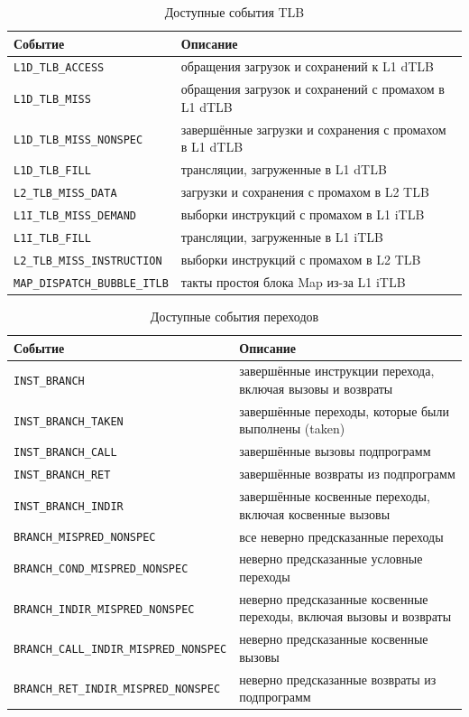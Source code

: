 \begin{table}[H]
\caption{Доступные события TLB}
\label{tab:events-tlb}
\small
\begin{tabularx}{\textwidth}{|l|X|}
	\hline
	Событие & Описание \\
	\hline
	\texttt{L1D\_TLB\_ACCESS} & обращения загрузок и сохранений к L1 dTLB \\
	\hline
	\texttt{L1D\_TLB\_MISS} & обращения загрузок и сохранений с промахом в L1 dTLB \\
	\hline
	\texttt{L1D\_TLB\_MISS\_NONSPEC} & завершённые загрузки и сохранения с промахом в L1 dTLB \\
	\hline
	\texttt{L1D\_TLB\_FILL} & трансляции, загруженные в L1 dTLB \\
	\hline
	\texttt{L2\_TLB\_MISS\_DATA} & загрузки и сохранения с промахом в L2 TLB \\
	\hline
	\texttt{L1I\_TLB\_MISS\_DEMAND} & выборки инструкций с промахом в L1 iTLB \\
	\hline
	\texttt{L1I\_TLB\_FILL} & трансляции, загруженные в L1 iTLB \\
	\hline
	\texttt{L2\_TLB\_MISS\_INSTRUCTION} & выборки инструкций с промахом в L2 TLB \\
	\hline
	\texttt{MAP\_DISPATCH\_BUBBLE\_ITLB} & такты простоя блока Map из-за L1 iTLB \\
	\hline
\end{tabularx}
\end{table}

\begin{table}[H]
\caption{Доступные события переходов}
\label{tab:events-branch}
\small
\begin{tabularx}{\textwidth}{|l|X|}
	\hline
	Событие & Описание \\
	\hline
	\texttt{INST\_BRANCH} & завершённые инструкции перехода, включая вызовы и возвраты \\
	\hline
	\texttt{INST\_BRANCH\_TAKEN} & завершённые переходы, которые были выполнены (taken) \\
	\hline
	\texttt{INST\_BRANCH\_CALL} & завершённые вызовы подпрограмм \\
	\hline
	\texttt{INST\_BRANCH\_RET} & завершённые возвраты из подпрограмм \\
	\hline
	\texttt{INST\_BRANCH\_INDIR} & завершённые косвенные переходы, включая косвенные вызовы \\
	\hline
	\texttt{BRANCH\_MISPRED\_NONSPEC} & все неверно предсказанные переходы \\
	\hline
	\texttt{BRANCH\_COND\_MISPRED\_NONSPEC} & неверно предсказанные условные переходы \\
	\hline
	\texttt{BRANCH\_INDIR\_MISPRED\_NONSPEC} & неверно предсказанные косвенные переходы, включая вызовы и возвраты \\
	\hline
	\texttt{BRANCH\_CALL\_INDIR\_MISPRED\_NONSPEC} & неверно предсказанные косвенные вызовы \\
	\hline
	\texttt{BRANCH\_RET\_INDIR\_MISPRED\_NONSPEC} & неверно предсказанные возвраты из подпрограмм \\
	\hline
\end{tabularx}
\end{table}

